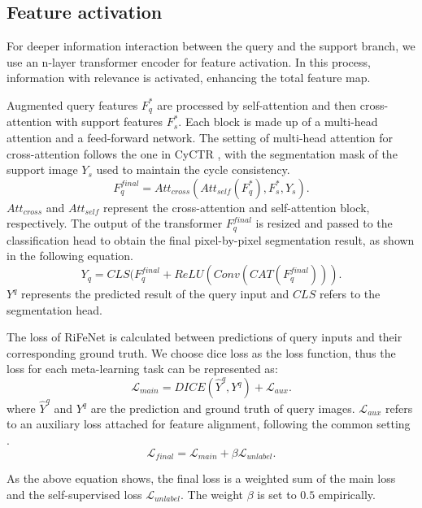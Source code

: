 \documentclass[letterpaper]{article} %
\begin{document}
\subsection{Feature activation}
For deeper information interaction between the query and the support branch, we use an n-layer transformer encoder for feature activation. In this process, information with relevance is activated, enhancing the total feature map.

Augmented query features $F^{*}_q$ are processed by self-attention and then cross-attention with support features $F^{*}_s$. Each block is made up of a multi-head attention and a feed-forward network. The setting of multi-head attention for cross-attention follows the one in CyCTR \cite{zhang2021few}, with the segmentation mask of the support image $Y_s$ used to maintain the cycle consistency.
\begin{equation}
F^{final}_q = Att_{cross}(Att_{self}(F^{*}_q),F^{*}_s,Y_s).
\end{equation}%
$Att_{cross}$ and $Att_{self}$ represent the cross-attention and self-attention block, respectively. The output of the transformer $F^{final}_q$ is resized and passed to the classification head to obtain the final pixel-by-pixel segmentation result, as shown in the following equation.
\begin{equation}
Y_q = CLS(F^{final}_q+ReLU(Conv(CAT(F^{final}_q))).
\end{equation}%
$Y^q$ represents the predicted result of the query input and $CLS$ refers to the segmentation head.

The loss of RiFeNet is calculated between predictions of query inputs and their corresponding ground truth. We choose dice loss as the loss function, thus the loss for each meta-learning task can be represented as:
\begin{equation}
\mathcal{L}_{main} = DICE (\hat{Y}^q,Y^q) + \mathcal{L}_{aux}.
\end{equation}%
where $\hat{Y}^q$ and ${Y}^q$ are the prediction and ground truth of query images. $\mathcal{L}_{aux}$ refers to an auxiliary loss attached for feature alignment, following the common setting \cite{milletari2016v}.
\begin{equation}
\mathcal{L}_{final} = \mathcal{L}_{main} + \beta \mathcal{L}_{unlabel}.
\end{equation}%

As the above equation shows, the final loss is a weighted sum of the main loss and the self-supervised loss $\mathcal{L}_{unlabel}$. The weight $\beta$ is set to $0.5$ empirically.
\end{document}
